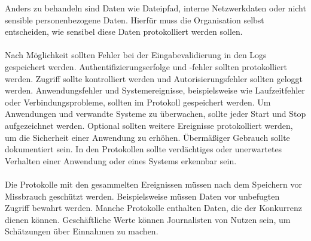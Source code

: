 Anders zu behandeln sind Daten wie Dateipfad, interne Netzwerkdaten oder nicht sensible personenbezogene Daten.
Hierfür muss die Organisation selbst entscheiden, wie sensibel diese Daten protokolliert werden sollen.\autocite{owasp}
\\
\\
Nach Möglichkeit sollten Fehler bei der Eingabevalidierung in den Logs gespeichert werden.
Authentifizierungserfolge und -fehler sollten protokolliert werden.
Zugriff sollte kontrolliert werden und Autorisierungsfehler sollten geloggt werden.
Anwendungsfehler und Systemereignisse, beispielsweise wie Laufzeitfehler oder Verbindungsprobleme, sollten im Protokoll gespeichert werden.
Um Anwendungen und verwandte Systeme zu überwachen, sollte jeder Start und Stop aufgezeichnet werden.
Optional sollten weitere Ereignisse protokolliert werden, um die Sicherheit einer Anwendung zu erhöhen.
Übermäßiger Gebrauch sollte dokumentiert sein.
In den Protokollen sollte verdächtiges oder unerwartetes Verhalten einer Anwendung oder eines Systems erkennbar sein.\autocite{owasp}
\\
\\
Die Protokolle mit den gesammelten Ereignissen müssen nach dem Speichern vor Missbrauch geschützt werden.
Beispielsweise müssen Daten vor unbefugten Zugriff bewahrt werden.
Manche Protokolle enthalten Daten, die der Konkurrenz dienen können.
Geschäftliche Werte können Journalisten von Nutzen sein, um Schätzungen über Einnahmen zu machen.\autocite{owasp}


